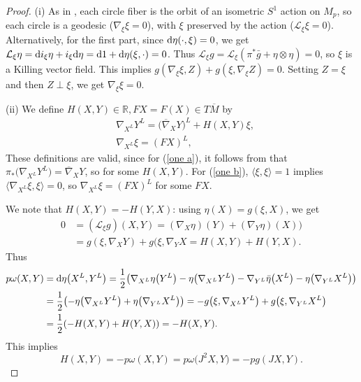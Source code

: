 \documentclass[pdftex]{sigma}
\numberwithin{equation}{section}
\theoremstyle{definition}
\newcommand{\BbR}{{\mathbb R}}
\newcommand{\R}{\BbR}
\newcommand{\bn}{\nabla}
\newcommand{\bxi}{\xi}
\newcommand{\bgg}{\bar g}
\newcommand{\bg}{ g}
\newcommand{\bx}{X}
\newcommand{\by}{Y}
\newcommand{\xl}{X^L}
\newcommand{\yl}{Y^L}
\newcommand{\om}{\overline{M}}
\newcommand{\omp}{M_p}
\begin{document}
\begin{proof}
(i) As in \cite[Section~3.2]{MRT4}, each circle fiber is the orbit of an isometric $S^1$ action on $\omp$, so each circle is a geodesic ($\bn_{\bxi}\bxi=0$), with $\bxi$ preserved by the action (${\mathcal L}_{\bxi} \bxi = 0$).
Alternatively, for the first part, since ${\rm d}\eta(\cdot, \bxi) = 0$, we get
$\mathcal L_{\bxi}\eta = {\rm d}i_{\bxi}\eta + i_{\bxi} {\rm d}\eta = {\rm d} 1 + {\rm d}\eta(\bxi,\cdot) = 0$.
Thus
$\mathcal L_{\bxi} \bg = \mathcal L_{\bxi} (\pi^*\bgg + \eta\otimes\eta) =0$, so $\bxi$ is a Killing vector field.
This implies $\bg(\bn_{\bxi}\bxi, Z) + \bg(\bxi, \bn_{\bxi}Z)=0$. Setting
 $Z = \bxi$ and then $Z\perp\bxi$, we get $\bn_{\bxi}\bxi = 0$.


(ii) We define $H(X,Y)\in \R, FX = F(X)\in T\om$ by
\begin{align}&\bn_{\xl} \yl= \bigl(\overline{\nabla}_XY\bigr)^L + H(X,Y)\bxi,\label{one a}\\
&\bn_{\xl} \bxi= (FX)^L,
\label{one b}
\end{align}
These definitions are valid, since for (\ref{one a}), it follows from \cite[Lemma 1]{oneill} that
$\pi_*\bigl(\bn_{\xl}\yl\bigr) = \overline{\nabla}_XY$, so
 for some $H(X,Y)$.
For (\ref{one b}),
$\langle\xi, \xi\rangle=1$ implies
$\langle\nabla_{X^{L}}\xi, \xi\rangle=0$,
so $\bn_{\xl} \bxi = (FX)^L$ for some $FX$.


We note that $H(X,Y) = -H(Y,X)$: using $\eta(\bx) = \bg(\bxi,\bx)$, we get
\begin{align*} 0&= (\mathcal L_{\bxi}g) (\bx,\by) = (\bn_{\bx}\eta)(\by) +
(\bn_{\by}\eta)(\bx))\\
&= \bg(\bxi, \bn_{\bx}\by) + \bg(\bxi, \bn_{\by}\bx = H(X,Y) + H(Y,X).
\end{align*}
Thus
\begin{align*} p\omega(X,Y) &= {\rm d} \eta\bigl(X^{L}, Y^{L}\bigr)
= \frac{1}{2}\bigl(\nabla_{X^{L}} \eta\bigl(Y^{L}\bigr) - \eta\bigl(\bn_{X^{L}}Y^{L}\bigr) - \nabla_{Y^{L}}\bar \eta\bigl(X^{L}\bigr) - \eta\bigl(\nabla_{Y^{L}}X^{L}\bigr) \bigr) \nonumber\\
 &= \frac{1}{2}\bigl(- \eta\bigl(\nabla_{X^{L}}Y^L\bigr) + \eta\bigl(\nabla_{Y^{L}}X^{L}\bigr) \bigr) = -\bg\bigl(\bxi,\nabla_{X^{L}}Y^L\bigr) +
 \bg\bigl(\bxi,\nabla_{Y^{L}}X^L\bigr) \nonumber\\
&= \frac{1}{2}(-H(X,Y) + H(Y,X))
= -H(X,Y).
 \end{align*}
 This implies
 \[H(X,Y) = -p\omega(X,Y) = p\omega\bigl(J^2X,Y\bigr) = -pg(JX,Y).\]



\end{proof}
\end{document}
